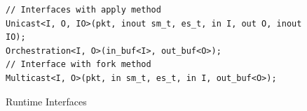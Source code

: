 \begin{figure}[H]
\begin{lstlisting}[frame=none]
// Interfaces with apply method
Unicast<I, O, IO>(pkt, inout sm_t, es_t, in I, out O, inout IO);
Orchestration<I, O>(in_buf<I>, out_buf<O>);
// Interface with fork method
Multicast<I, O>(pkt, in sm_t, es_t, in I, out_buf<O>);
\end{lstlisting}
\caption{Runtime Interfaces}
\label{fig:interfaces}
\end{figure}

